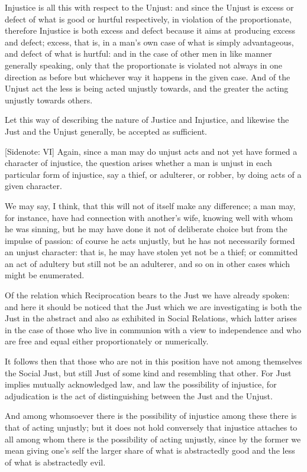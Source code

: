 Injustice is all this with respect to the Unjust: and since the Unjust
is excess or defect of what is good or hurtful respectively, in
violation of the proportionate, therefore Injustice is both excess and
defect because it aims at producing excess and defect; excess, that is,
in a man's own case of what is simply advantageous, and defect of what
is hurtful: and in the case of other men in like manner generally
speaking, only that the proportionate is violated not always in one
direction as before but whichever way it happens in the given case. And
of the Unjust act the less is being acted unjustly towards, and the
greater the acting unjustly towards others.

Let this way of describing the nature of Justice and Injustice, and
likewise the Just and the Unjust generally, be accepted as sufficient.

[Sidenote: VI] Again, since a man may do unjust acts and not yet have
formed a character of injustice, the question arises whether a man is
unjust in each particular form of injustice, say a thief, or adulterer,
or robber, by doing acts of a given character.

We may say, I think, that this will not of itself make any difference; a
man may, for instance, have had connection with another's wife, knowing
well with whom he was sinning, but he may have done it not of deliberate
choice but from the impulse of passion: of course he acts unjustly, but
he has not necessarily formed an unjust character: that is, he may have
stolen yet not be a thief; or committed an act of adultery but still not
be an adulterer, and so on in other cases which might be enumerated.

Of the relation which Reciprocation bears to the Just we have already
spoken: and here it should be noticed that the Just which we are
investigating is both the Just in the abstract and also as exhibited in
Social Relations, which latter arises in the case of those who live in
communion with a view to independence and who are free and equal either
proportionately or numerically.

It follows then that those who are not in this position have not among
themselves the Social Just, but still Just of some kind and resembling
that other. For Just implies mutually acknowledged law, and law the
possibility of injustice, for adjudication is the act of distinguishing
between the Just and the Unjust.

And among whomsoever there is the possibility of injustice among these
there is that of acting unjustly; but it does not hold conversely that
injustice attaches to all among whom there is the possibility of acting
unjustly, since by the former we mean giving one's self the larger share
of what is abstractedly good and the less of what is abstractedly evil.

